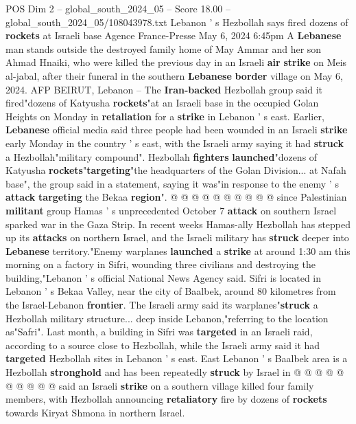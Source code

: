 \begin{textsample}{POS Dim 2 – global\_south\_2024\_05 – Score 18.00 – global\_south\_2024\_05/108043978.txt}  \label{ex:f2_pos_224}
Lebanon ' s Hezbollah says fired dozens of \textbf{rockets} at Israeli base Agence France-Presse May 6, 2024 6:45pm A \textbf{Lebanese} man stands outside the destroyed family home of May Ammar and her son Ahmad Hnaiki, who were killed the previous day in an Israeli \textbf{air} \textbf{strike} on Meis al-jabal, after their funeral in the southern \textbf{Lebanese} \textbf{border} village on May 6, 2024.
AFP BEIRUT, Lebanon -- The \textbf{Iran-backed} Hezbollah group said it fired"dozens of Katyusha \textbf{rockets}"at an Israeli base in the occupied Golan Heights on Monday in \textbf{retaliation} for a \textbf{strike} in Lebanon ' s east.
Earlier, \textbf{Lebanese} official media said three people had been wounded in an Israeli \textbf{strike} early Monday in the country ' s east, with the Israeli army saying it had \textbf{struck} a Hezbollah"military compound".
Hezbollah \textbf{fighters} \textbf{launched}"dozens of Katyusha \textbf{rockets}"\textbf{targeting}"the headquarters of the Golan Division... at Nafah base", the group said in a statement, saying it was"in response to the enemy ' s \textbf{attack} \textbf{targeting} the Bekaa \textbf{region}". @ @ @ @ @ @ @ @ @ @ since Palestinian \textbf{militant} group Hamas ' s unprecedented October 7 \textbf{attack} on southern Israel sparked war in the Gaza Strip.
In recent weeks Hamas-ally Hezbollah has stepped up its \textbf{attacks} on northern Israel, and the Israeli military has \textbf{struck} deeper into \textbf{Lebanese} territory."Enemy warplanes \textbf{launched} a \textbf{strike} at around 1:30 am this morning on a factory in Sifri, wounding three civilians and destroying the building,"Lebanon ' s official National News Agency said.
Sifri is located in Lebanon ' s Bekaa Valley, near the city of Baalbek, around 80 kilometres from the Israel-Lebanon \textbf{frontier}.
The Israeli army said its warplanes"\textbf{struck} a Hezbollah military structure... deep inside Lebanon,"referring to the location as"Safri".
Last month, a building in Sifri was \textbf{targeted} in an Israeli raid, according to a source close to Hezbollah, while the Israeli army said it had \textbf{targeted} Hezbollah sites in Lebanon ' s east.
East Lebanon ' s Baalbek area is a Hezbollah \textbf{stronghold} and has been repeatedly \textbf{struck} by Israel in @ @ @ @ @ @ @ @ @ @ said an Israeli \textbf{strike} on a southern village killed four family members, with Hezbollah announcing \textbf{retaliatory} fire by dozens of \textbf{rockets} towards Kiryat Shmona in northern Israel.

\end{textsample}
